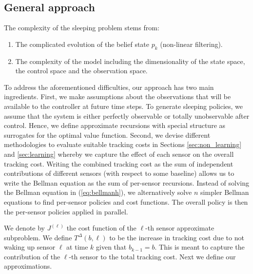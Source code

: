\documentclass[journal,draftcls,onecolumn,11pt]{IEEEtran}
\begin{document}
\subsection{General approach}
The complexity of the sleeping problem stems from:
\begin{enumerate}
\item The complicated evolution of the belief state $p_k$ (non-linear filtering).
\item The complexity of the model including the dimensionality of the state space, the control space and the observation space.
\end{enumerate}
To address the aforementioned difficulties, our approach has two main ingredients. First, we make assumptions about the observations that will be available to the controller at future time steps. To generate sleeping policies, we assume that the system is either perfectly observable or totally unobservable after control. Hence, we define approximate recursions with special structure as surrogates for the optimal value function. Second, we devise different methodologies to evaluate suitable tracking costs in Sections \ref{sec:non_learning} and \ref{sec:learning} whereby we capture the effect of each sensor on the overall tracking cost. Writing the combined tracking cost as the sum of independent contributions of different sensors (with respect to some baseline) allows us to write the Bellman equation as the sum of per-sensor recursions. Instead of solving the Bellman equation in (\ref{eq:bellmanh}), we alternatively solve $n$ simpler Bellman equations to find per-sensor policies and cost functions. The overall policy is then the per-sensor policies applied in parallel.

We denote by $J^{(\ell)}$ the cost function of the $\ell$-th sensor approximate subproblem. We define $T^\Delta(b,\ell)$ to be the increase in tracking cost due to not waking up sensor $\ell$ at time $k$ given that $b_{k-1} = b$. This is meant to capture the contribution of the $\ell$-th sensor to the total tracking cost. Next we define our approximations.
\end{document}
